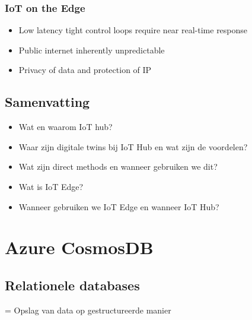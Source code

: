 \documentclass{article}
\begin{document}
\subsubsection{IoT on the Edge}

\begin{itemize}
    \item Low latency tight control loops require near real-time response
    \item Public internet inherently unpredictable
    \item Privacy of data and protection of IP
\end{itemize}

\subsection{Samenvatting}

\begin{itemize}
    \item Wat en waarom IoT hub?
    \item Waar zijn digitale twins bij IoT Hub en wat zijn de voordelen?
    \item Wat zijn direct methods en wanneer gebruiken we dit?
    \item Wat is IoT Edge?
    \item Wanneer gebruiken we IoT Edge en wanneer IoT Hub?
\end{itemize}

\section{Azure CosmosDB}

\subsection{Relationele databases}

= Opslag van data op gestructureerde manier
\end{document}
